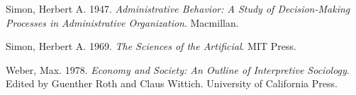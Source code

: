 \documentclass[
  a4paper,
]{scrbook}
\newlength{\cslhangindent}
\newenvironment{CSLReferences}[2] %
 {\begin{list}{}{%
  \setlength{\itemindent}{0pt}
  \setlength{\leftmargin}{0pt}
  \setlength{\parsep}{0pt}
  \ifodd #1
   \setlength{\leftmargin}{\cslhangindent}
   \setlength{\itemindent}{-1\cslhangindent}
  \fi
  \setlength{\itemsep}{#2\baselineskip}}}
 {\end{list}}
\begin{document}
\begin{CSLReferences}{1}{1}
Simon, Herbert A. 1947. \emph{Administrative Behavior: A Study of
Decision-Making Processes in Administrative Organization}. Macmillan.

Simon, Herbert A. 1969. \emph{The Sciences of the Artificial}. MIT
Press.

Weber, Max. 1978. \emph{Economy and Society: An Outline of Interpretive
Sociology}. Edited by Guenther Roth and Claus Wittich. University of
California Press.

\end{CSLReferences}


\backmatter
\end{document}
